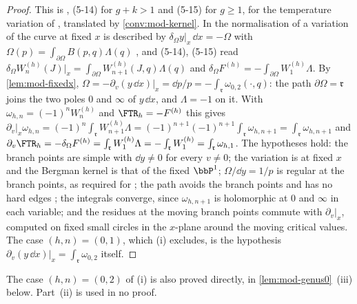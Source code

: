 \begin{proof}
This is \cite[Thm.~5.1]{Eynard:2007kz}, (5-14) for $g+k>1$ and (5-15) for $g\geq 1$, for the temperature variation of \cite[\S5.3, (5-27)--(5-30)]{Eynard:2007kz}, translated by \cref{conv:mod-kernel}. In the normalisation of \cite{Eynard:2007kz} a variation of the curve at fixed $x$ is described by $\delta_\Omega y|_x\,\dd x=-\Omega$ \cite[(5-1)]{Eynard:2007kz} with $\Omega(p)=\int_{\partial\Omega}B(p,q)\Lambda(q)$ \cite[(5-13)]{Eynard:2007kz}, and (5-14), (5-15) read $\delta_\Omega W^{(h)}_n(J)|_{x}=\int_{\partial\Omega}W^{(h)}_{n+1}(J,q)\Lambda(q)$ and $\delta_\Omega F^{(h)}=-\int_{\partial\Omega}W^{(h)}_1\Lambda$. By \cref{lem:mod-fixedx}, $\Omega=-\partial_v(y\,\dd x)|_x=\dd p/p=-\int_{\mathfrak r}\omega_{0,2}(\cdot,q)$: the path $\partial\Omega=\mathfrak r$ joins the two poles $0$ and $\infty$ of $y\,\dd x$, and $\Lambda=-1$ on it. With $\omega_{h,n}=(-1)^nW^{(h)}_n$ and $\FTR_h=-F^{(h)}$ this gives $\partial_v|_x\omega_{h,n}=(-1)^n\int_{\mathfrak r}W^{(h)}_{n+1}\Lambda=(-1)^{n+1}(-1)^{n+1}\int_{\mathfrak r}\omega_{h,n+1}=\int_{\mathfrak r}\omega_{h,n+1}$ and $\partial_v\FTR_h=-\delta_\Omega F^{(h)}=\int_{\mathfrak r}W^{(h)}_1\Lambda=-\int_{\mathfrak r}W^{(h)}_1=\int_{\mathfrak r}\omega_{h,1}$. The hypotheses hold: the branch points are simple with $\dd y\neq 0$ for every $v\neq 0$; the variation is at fixed $x$ and the Bergman kernel is that of the fixed $\bbP^1$; $\Omega/\dd y=1/p$ is regular at the branch points, as required for \cite[(5-4)]{Eynard:2007kz}; the path avoids the branch points and has no hard edges \cite[(5-13), footnote~8]{Eynard:2007kz}; the integrals converge, since $\omega_{h,n+1}$ is holomorphic at $0$ and $\infty$ in each variable; and the residues at the moving branch points commute with $\partial_v|_x$, computed on fixed small circles in the $x$-plane around the moving critical values. The case $(h,n)=(0,1)$, which (i) excludes, is the hypothesis $\partial_v(y\,\dd x)|_x=\int_{\mathfrak r}\omega_{0,2}$ itself.
\end{proof}

The case $(h,n)=(0,2)$ of (i) is also proved directly, in \cref{lem:mod-genus0}~(iii) below. Part~(ii) is used in no proof.

